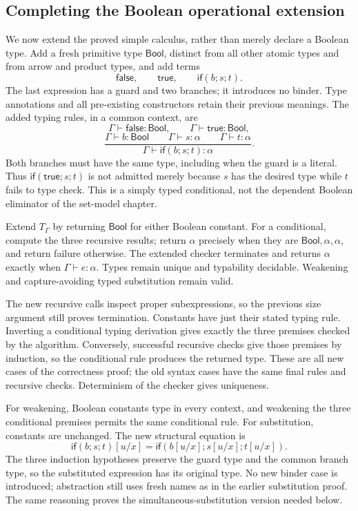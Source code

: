 \subsection{Completing the Boolean operational extension}
\label{sec:simple_boolean_extension}
We now extend the proved simple calculus, rather than merely declare a
Boolean type. Add a fresh primitive type $\mathsf{Bool}$, distinct from
all other atomic types and from arrow and product types, and add terms
\[
\mathsf{false},\qquad\mathsf{true},\qquad
\mathsf{if}(b;s;t).
\]
The last expression has a guard and two branches; it introduces no
binder. Type annotations and all pre-existing constructors retain their
previous meanings. The added typing rules, in a common context, are
\[
\Gamma\vdash\mathsf{false}:\mathsf{Bool},\qquad
\Gamma\vdash\mathsf{true}:\mathsf{Bool},
\]
\[
\frac{\Gamma\vdash b:\mathsf{Bool}\qquad
      \Gamma\vdash s:\alpha\qquad\Gamma\vdash t:\alpha}
     {\Gamma\vdash\mathsf{if}(b;s;t):\alpha}.
\]
Both branches must have the same type, including when the guard is a
literal. Thus $\mathsf{if}(\mathsf{true};s;t)$ is not admitted merely
because $s$ has the desired type while $t$ fails to type check.
This is a simply typed conditional, not the dependent Boolean eliminator
of the set-model chapter.

\begin{proposition}
Extend $T_\Gamma$ by returning $\mathsf{Bool}$ for either Boolean
constant. For a conditional, compute the three recursive results;
return $\alpha$ precisely when they are
$\mathsf{Bool},\alpha,\alpha$, and return failure otherwise.
The extended checker terminates and returns $\alpha$ exactly when
$\Gamma\vdash e:\alpha$. Types remain unique and typability decidable.
Weakening and capture-avoiding typed substitution remain valid.
\end{proposition}
\Proof
The new recursive calls inspect proper subexpressions, so the previous
size argument still proves termination. Constants have just their
stated typing rule. Inverting a conditional typing derivation gives
exactly the three premises checked by the algorithm. Conversely,
successful recursive checks give those premises by induction, so the
conditional rule produces the returned type. These are all new cases
of the correctness proof; the old syntax cases have the same final
rules and recursive checks. Determinism of the checker gives uniqueness.

For weakening, Boolean constants type in every context, and weakening
the three conditional premises permits the same conditional rule.
For substitution, constants are unchanged. The new structural equation is
\[
\mathsf{if}(b;s;t)[u/x]
 =\mathsf{if}(b[u/x];s[u/x];t[u/x]).
\]
The three induction hypotheses preserve the guard type and the common
branch type, so the substituted expression has its original type.
No new binder case is introduced; abstraction still uses fresh names
as in the earlier substitution proof. The same reasoning proves the
simultaneous-substitution version needed below.
\Done

